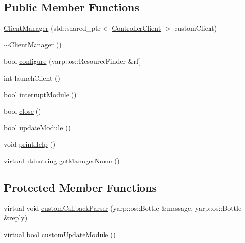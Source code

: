 \subsection*{Public Member Functions}
\begin{DoxyCompactItemize}
\item 
\hyperlink{classocra__recipes_1_1ClientManager_ad5e77797451b303bf063ca6c1ebf8307}{Client\+Manager} (std\+::shared\+\_\+ptr$<$ \hyperlink{classocra__recipes_1_1ControllerClient}{Controller\+Client} $>$ custom\+Client)
\item 
\hyperlink{classocra__recipes_1_1ClientManager_af605d4fa9dab04b9874bf307277cd8a3}{$\sim$\+Client\+Manager} ()
\item 
bool \hyperlink{classocra__recipes_1_1ClientManager_a341d7c03d2c2b645f9b815f02baf323e}{configure} (yarp\+::os\+::\+Resource\+Finder \&rf)
\item 
int \hyperlink{classocra__recipes_1_1ClientManager_a443fb4edc4bac1c1e24e32f26a730519}{launch\+Client} ()
\item 
bool \hyperlink{classocra__recipes_1_1ClientManager_a3724b1ba55a2a0e81774aa674f567e34}{interrupt\+Module} ()
\item 
bool \hyperlink{classocra__recipes_1_1ClientManager_ace715a5dc663e956edc24d976cc7ad09}{close} ()
\item 
bool \hyperlink{classocra__recipes_1_1ClientManager_a2fb40c4d2440367c4f66ad5815e6b1f8}{update\+Module} ()
\item 
void \hyperlink{classocra__recipes_1_1ClientManager_aa935699ac8fe135a066ce69f7ebc6d0d}{print\+Help} ()
\item 
virtual std\+::string \hyperlink{classocra__recipes_1_1ClientManager_a3fd7aa39812c9ffdb32b732c4f854862}{get\+Manager\+Name} ()
\end{DoxyCompactItemize}
\subsection*{Protected Member Functions}
\begin{DoxyCompactItemize}
\item 
virtual void \hyperlink{classocra__recipes_1_1ClientManager_ab81a0bc48b6ac66b97988ef836df3cd6}{custom\+Callback\+Parser} (yarp\+::os\+::\+Bottle \&message, yarp\+::os\+::\+Bottle \&reply)
\item 
virtual bool \hyperlink{classocra__recipes_1_1ClientManager_a51e6fd902ad96b27c2c976305f7306fd}{custom\+Update\+Module} ()
\end{DoxyCompactItemize}


